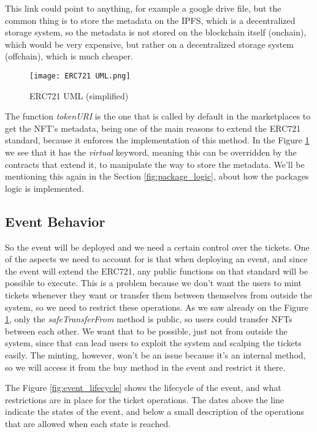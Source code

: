 This link could point to anything, for example a google drive file, but the
common thing is to store the metadata on the IPFS, which is a decentralized
storage system, so the metadata is not stored on the blockchain itself
(onchain), which would be very expensive, but rather on a decentralized storage
system (offchain), which is much cheaper.

\begin{figure}[H]
	\texttt{[image: ERC721 UML.png]}
	\centering
	\caption{ERC721 UML (simplified)}
	\label{fig:erc721_uml}
\end{figure}

The function \textit{tokenURI} is the one that is called by default in the
marketplaces to get the NFT's metadata, being one of the main reasons to extend
the ERC721 standard, because it enforces the implementation of this method. In
the Figure \ref{fig:erc721_uml} we see that it has the \textit{virtual}
keyword, meaning this can be overridden by the contracts that extend it, to
manipulate the way to store the metadata. We'll be mentioning this again in the
Section \ref{fig:package_logic}, about how the packages logic is implemented.

\subsection{Event Behavior}
\label{subsec:event_behavior}

So the event will be deployed and we need a certain control over the tickets.
One of the aspects we need to account for is that when deploying an event, and
since the event will extend the ERC721, any public functions on that standard
will be possible to execute. This is a problem because we don't want the users
to mint tickets whenever they want or transfer them between themselves from
outside the system, so we need to restrict these operations. As we saw already
on the Figure \ref{fig:erc721_uml}, only the \textit{safeTransferFrom} method
is public, so users could transfer NFTs between each other. We want that to be
possible, just not from outside the system, since that can lead users to
exploit the system and scalping the tickets easily. The minting, however, won't
be an issue because it's an internal method, so we will access it from the buy
method in the event and restrict it there.

The Figure \ref{fig:event_lifecycle} shows the lifecycle of the event, and what
restrictions are in place for the ticket operations. The dates above the line
indicate the states of the event, and below a small description of the
operations that are allowed when each state is reached.

